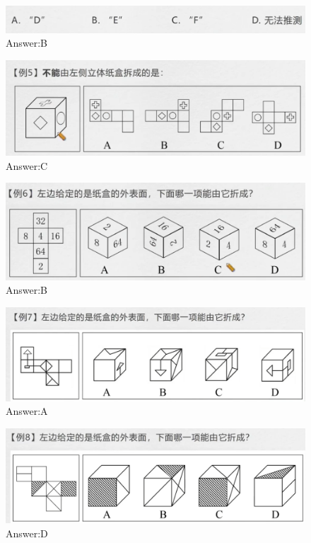 \documentclass{article}
\numberwithin{equation}{section}						%
\numberwithin{figure}{section}							%
\begin{document}
\begin{sloppypar}
\begin{figure}[H]
\end{figure}

\begin{figure}[H]
     \centering
     \includegraphics[width=0.6\linewidth]{95.png}
		\caption{Answer:B}
\end{figure}


\begin{figure}[H]
     \centering
     \includegraphics[width=0.6\linewidth]{96.png}
		\caption{Answer:C}
\end{figure}


\begin{figure}[H]
     \centering
     \includegraphics[width=0.6\linewidth]{97.png}
		\caption{Answer:B}
\end{figure}


\begin{figure}[H]
     \centering
     \includegraphics[width=0.6\linewidth]{98.png}
		\caption{Answer:A}
\end{figure}

\begin{figure}[H]
     \centering
     \includegraphics[width=0.6\linewidth]{99.png}
		\caption{Answer:D}
\end{figure}



\end{sloppypar}
\end{document}
